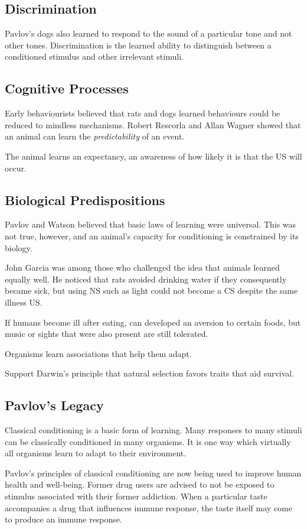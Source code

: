 \documentclass[12pt]{article}
\begin{document}
\subsection{Discrimination}
Pavlov's dogs also learned to respond to the sound of a particular tone and not other tones. Discrimination is the learned ability to distinguish between a conditioned stimulus and other irrelevant stimuli.

\subsection*{Cognitive Processes}
Early behaviourists believed that rats and dogs learned behaviours could be reduced to mindless mechanisms. Robert Rescorla and Allan Wagner showed that an animal can learn the \textit{predictability} of an event. 

The animal learns an expectancy, an awareness of how likely it is that the US will occur.

\subsection*{Biological Predispositions}
Pavlov and Watson believed that basic laws of learning were universal. This was not true, however, and an animal's capacity for conditioning is constrained by its biology. 

John Garcia was among those who challenged the idea that animals learned equally well. He noticed that rats avoided drinking water if they consequently became sick, but using NS such as light could not become a CS despite the same illness US. 

If humans become ill after eating, can developed an aversion to certain foods, but music or sights that were also present are still tolerated.

Organisms learn associations that help them adapt. 

Support Darwin's principle that natural selection favors traits that aid survival. 

\subsection*{Pavlov's Legacy}
Classical conditioning is a basic form of learning. Many responses to many stimuli can be classically conditioned in many organisms. It is one way which virtually all organisms learn to adapt to their environment.

Pavlov's principles of classical conditioning are now being used to improve human health and well-being. Former drug users are advised to not be exposed to stimulus associated with their former addiction. When a particular taste accompanies a drug that influences immune response, the taste itself may come to produce an immune response.
\end{document}
